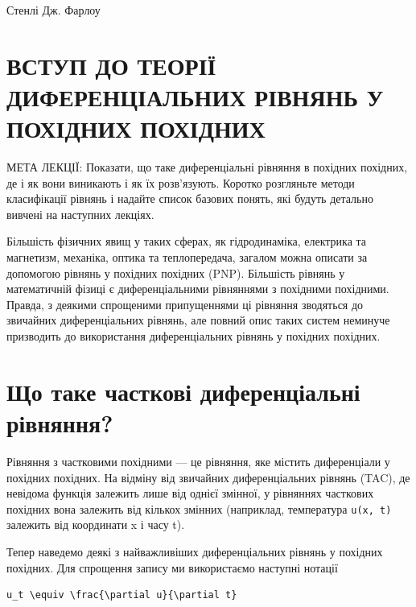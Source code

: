 \documentclass[
  ukrainian,
]{article}
\begin{document}
Стенлі Дж. Фарлоу

\section{ВСТУП ДО ТЕОРІЇ ДИФЕРЕНЦІАЛЬНИХ РІВНЯНЬ У ПОХІДНИХ
ПОХІДНИХ}\label{ux432ux441ux442ux443ux43f-ux434ux43e-ux442ux435ux43eux440ux456ux457-ux434ux438ux444ux435ux440ux435ux43dux446ux456ux430ux43bux44cux43dux438ux445-ux440ux456ux432ux43dux44fux43dux44c-ux443-ux43fux43eux445ux456ux434ux43dux438ux445-ux43fux43eux445ux456ux434ux43dux438ux445}

МЕТА ЛЕКЦІЇ: Показати, що таке диференціальні рівняння в похідних
похідних, де і як вони виникають і як їх розв'язують. Коротко розгляньте
методи класифікації рівнянь і надайте список базових понять, які будуть
детально вивчені на наступних лекціях.

Більшість фізичних явищ у таких сферах, як гідродинаміка, електрика та
магнетизм, механіка, оптика та теплопередача, загалом можна описати за
допомогою рівнянь у похідних похідних (PNP). Більшість рівнянь у
математичній фізиці є диференціальними рівняннями з похідними похідними.
Правда, з деякими спрощеними припущеннями ці рівняння зводяться до
звичайних диференціальних рівнянь, але повний опис таких систем неминуче
призводить до використання диференціальних рівнянь у похідних похідних.

\section{Що таке часткові диференціальні
рівняння?}\label{ux449ux43e-ux442ux430ux43aux435-ux447ux430ux441ux442ux43aux43eux432ux456-ux434ux438ux444ux435ux440ux435ux43dux446ux456ux430ux43bux44cux43dux456-ux440ux456ux432ux43dux44fux43dux43dux44f}

Рівняння з частковими похідними --- це рівняння, яке містить
диференціали у похідних похідних. На відміну від звичайних
диференціальних рівнянь (TAC), де невідома функція залежить лише від
однієї змінної, у рівняннях часткових похідних вона залежить від кількох
змінних (наприклад, температура \texttt{u(x,\ t)} залежить від
координати x і часу t).

Тепер наведемо деякі з найважливіших диференціальних рівнянь у похідних
похідних. Для спрощення запису ми використаємо наступні нотації

\begin{verbatim}
u_t \equiv \frac{\partial u}{\partial t}
\end{verbatim}
\end{document}
